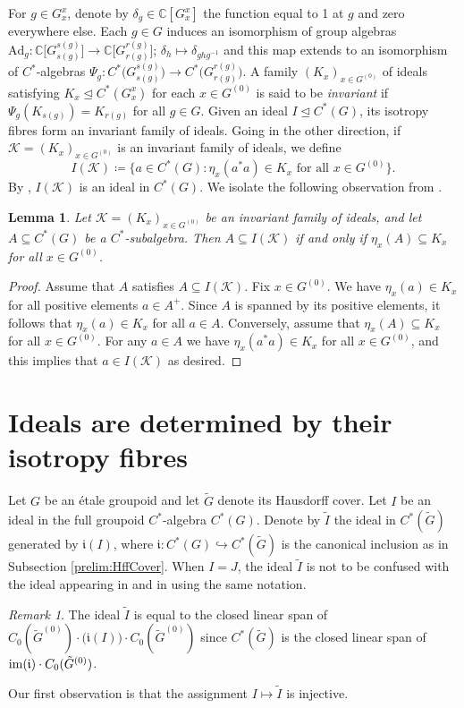 \documentclass[11pt, oneside, reqno]{amsart}
\newcommand{\Gu}{G^{(0)}}
\newcommand{\im}{{\rm{im}}}
\newcommand{\tiG}{\tilde{G}}
\newcommand{\tiGu}{\tilde{G}^{(0)}}
\newcommand{\mfi}{\mathfrak i}
\newtheorem{lem}[thm]{Lemma}
\theoremstyle{definition}
\theoremstyle{remark}
\newtheorem{rmk}[thm]{Remark}
\numberwithin{equation}{section}
\begin{document}
For $g\in G^x_x$, denote by $\delta_{g}\in\mathbb{C}[G^{x}_{x}]$ the function equal to 1 at $g$ and zero everywhere else. Each $g \in G$ induces an isomorphism of group algebras $\text{Ad}_g \colon \mathbb{C}\big[G^{s(g)}_{s(g)}\big] \to \mathbb{C}\big[G^{r(g)}_{r(g)}\big]$; $\delta_{h}\mapsto \delta_{ghg^{-1}}$ and this map extends to an isomorphism of $C^*$-algebras $\Psi_g \colon C^*\big(G^{s(g)}_{s(g)}\big) \to C^*\big(G^{r(g)}_{r(g)}\big)$. A family $(K_x)_{x \in \Gu}$ of ideals satisfying $K_x \trianglelefteq C^*(G_x^x)$ for each $x \in \Gu$ is said to be \emph{invariant} if $\Psi_g(K_{s(g)}) = K_{r(g)}$ for all $g \in G$. Given an ideal $I \trianglelefteq C^*(G)$, its isotropy fibres form an invariant family of ideals. Going in the other direction, if $\mathcal{K} = (K_x)_{x \in \Gu}$ is an invariant family of ideals, we define
\[
I(\mathcal{K}) \coloneq \{a \in C^*(G) \colon \eta_x(a^*a) \in K_x \text{ for all } x \in \Gu\}.
\]
By \cite[Corollary~2.9]{CN24}, $I(\mathcal{K})$ is an ideal in $C^*(G)$. We isolate the following observation from \cite{CN24}.

\begin{lem}\label{FamId}
    Let $\mathcal{K} = (K_x)_{x \in \Gu}$ be an invariant family of ideals, and let $A \subseteq C^*(G)$ be a $C^*$-subalgebra. Then $A \subseteq I(\mathcal{K})$ if and only if $\eta_x(A) \subseteq K_x$ for all $x \in \Gu$.
\end{lem}

\begin{proof}
    Assume that $A$ satisfies $A \subseteq I(\mathcal{K})$. Fix $x \in \Gu$. We have $\eta_x(a) \in K_x$ for all positive elements $a \in A^+$. Since $A$ is spanned by its positive elements, it follows that $\eta_x(a) \in K_x$ for all $a \in A$. Conversely, assume that $\eta_x(A) \subseteq K_x$ for all $x \in \Gu$. For any $a \in A$ we have $\eta_x(a^*a) \in K_x$ for all $x \in \Gu$, and this implies that $a \in I(\mathcal{K})$ as desired.
\end{proof}

\section{Ideals are determined by their isotropy fibres}\label{sec:Ideals}

Let $G$ be an \'etale groupoid and let $\tiG$ denote its Hausdorff cover. Let $I$ be an ideal in the full groupoid $C^*$-algebra $C^{*}(G)$. Denote by $\tilde{I}$ the ideal in $C^{*}(\tiG)$ generated by $\mfi(I)$, where $\mfi \colon C^{*}(G) \hookrightarrow C^{*}(\tiG)$ is the canonical inclusion as in Subsection \ref{prelim:HffCover}. When $I = J$, the ideal $\tilde{I}$ is not to be confused with the ideal appearing in \cite[Definition~4.14]{BGHL} and in \cite{Hume} using the same notation. 
\begin{rmk}
    The ideal $\tilde{I}$ is equal to the closed linear span of $C_{0}(\tiGu)\cdot \big(\mfi(I)\big)\cdot C_{0}(\tiGu)$ since $C^{*}(\tiG)$ is the closed linear span of $\im(\mfi) \cdot C_{0}(\tiGu)$. 
\end{rmk}
Our first observation is that the assignment $I \mapsto \tilde{I}$ is injective.
\end{document}
